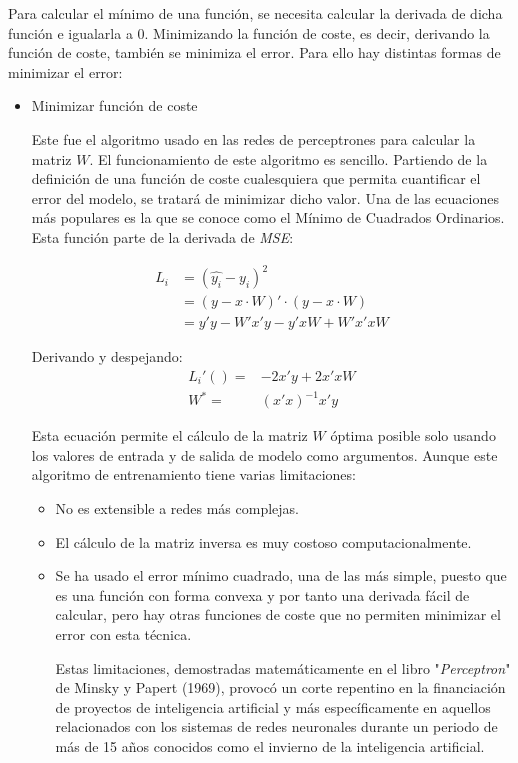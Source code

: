 Para calcular el mínimo de una función, se necesita calcular la derivada de dicha función e igualarla a 0. Minimizando la función de coste, es decir, derivando la función de coste, también se minimiza el error. Para ello hay distintas formas de minimizar el error:
\begin{itemize}
\item Minimizar función de coste

Este fue el algoritmo usado en las redes de perceptrones para calcular la matriz $W$. El funcionamiento de este algoritmo es sencillo. Partiendo de la definición de una función de coste cualesquiera que permita cuantificar el error del modelo, se tratará de minimizar dicho valor. Una de las ecuaciones más populares es la que se conoce como el Mínimo de Cuadrados Ordinarios. Esta función parte de la derivada de \textit{MSE}:

\begin{equation}
    \begin{split}
    L_i & =  (\hat{y_i} - y_i)^2 \\
     & = (y - x \cdot W)' \cdot (y - x \cdot W) \\
     & = y'y - W'x'y - y'xW + W'x'x W
  \end{split}
\end{equation}

Derivando y despejando:
\begin{equation}
    \begin{split}
L_i'() = & -2x'y + 2x'xW \\
W^* = & (x'x)^{-1}x'y
\end{split}
\end{equation}

Esta ecuación permite el cálculo de la matriz $W$ óptima posible solo usando los valores de entrada y de salida de modelo como argumentos. Aunque este algoritmo de entrenamiento tiene varias limitaciones:
\begin{itemize}
\item No es extensible a redes más complejas.
\item El cálculo de la matriz inversa es muy costoso computacionalmente.
\item Se ha usado el error mínimo cuadrado, una de las más simple, puesto que es una función con forma convexa y por tanto una derivada fácil de calcular, pero hay otras funciones de coste que no permiten minimizar el error con esta técnica.
\newline

Estas limitaciones, demostradas matemáticamente en el libro "\textit{Perceptron}"\cite{papert} de Minsky y Papert (1969), provocó un corte repentino en la financiación de proyectos de inteligencia artificial y más específicamente en aquellos relacionados con los sistemas de redes neuronales durante un periodo de más de 15 años conocidos como el invierno de la inteligencia artificial.
\end{itemize}



\end{itemize}
